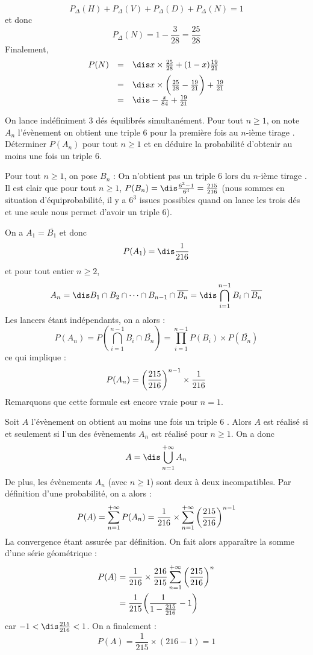 \documentclass[a4paper,10pt]{report}
\begin{document}
\begin{enumerate}
\begin{enumerate}
\[ P_{\Delta}(H) + P_{\Delta}(V) + P_{\Delta}(D) + P_{\Delta}(N) = 1 \]
et donc 
\[ P_{\Delta}(N) = 1 - \frac{3}{28} = \frac{25}{28} \]
Finalement,
\[ \begin{array}{ccl}
P(N) & = & \dis x \times \frac{25}{28}+ (1-x) \frac{19}{21} \\[0.2cm]
& = & \dis x \times \bigg{(} \frac{25}{28} - \frac{19}{21} \bigg{)} + \frac{19}{21} \\[0.2cm]
& = & \dis - \frac{x}{84} + \frac{19}{21} \\
\end{array}\]
\end{enumerate}
\end{enumerate}


\begin{Exercice}{} On lance indéfiniment 3 dés équilibrés simultanément. Pour tout $n \geq 1$, on note $A_n$ l'évènement \og on obtient une triple 6 pour la première fois au $n$-ième tirage \fg . Déterminer $P(A_n)$ pour tout $n \geq 1$ et en déduire la probabilité d'obtenir au moins une fois un triple $6$.
\end{Exercice}

\corr Pour tout $n \geq 1$, on pose $B_n$ : \og On n'obtient pas un triple 6 lors du $n$-ième tirage \fg . Il est clair que pour tout $n \geq 1$, $P(B_n) = \dis \frac{6^3-1}{6^3} = \frac{215}{216}$ (nous sommes en situation d'équiprobabilité, il y a $6^3$ issues possibles quand on lance les trois dés et une seule nous permet d'avoir un triple $6$).

\medskip

\noindent On a $A_1=\overline{B_1}$ et donc 
$$P(A_1) = \dis \frac{1}{216}$$
et pour tout entier $n \geq 2$, 
$$A_n = \dis B_1 \cap B_2 \cap \cdots \cap B_{n-1} \cap \overline{B_n} = \dis \bigcap_{i=1}^{n-1} B_i \cap \overline{B_n}$$
Les lancers étant indépendants, on a alors :
\[ P(A_n) = P(\bigcap_{i=1}^{n-1} B_i \cap \overline{B_n}) = \prod_{i=1}^{n-1} P(B_i) \times P( \overline{B_n})\]
ce qui implique :
\[ P(A_n) = \bigg{(} \frac{215}{216} \bigg{)}^{n-1} \times \frac{1}{216} \]
Remarquons que cette formule est encore vraie pour $n=1$.

\medskip
\noindent Soit $A$ l'évènement \og on obtient au moins une fois un triple $6$ \fg . Alors $A$ est réalisé si et seulement si l'un des évènements $A_n$ est réalisé pour $n \geq 1$. On a donc 
$$A= \dis \bigcup_{n=1}^{+ \infty} A_n$$
De plus, les évènements $A_n$ (avec $n \geq 1$) sont deux à deux incompatibles. Par définition d'une probabilité, on a alors :
\[ P(A) = \sum_{n=1}^{+ \infty} P(A_n) = \frac{1}{216} \times \sum_{n=1}^{+ \infty} \bigg{(} \frac{215}{216} \bigg{)}^{n-1} \]
La convergence étant assurée par définition. On fait alors apparaître la somme d'une série géométrique :
\begin{align*}
P(A) & = \frac{1}{216} \times \frac{216}{215} \sum_{n=1}^{+ \infty} \bigg{(} \frac{215}{216} \bigg{)}^{n} \\
& = \frac{1}{215} \bigg{(} \frac{1}{1-\frac{215}{216}} - 1 \bigg{)} 
\end{align*}
car $-1 < \dis \frac{215}{216} < 1$. On a finalement :
\[ P(A) = \frac{1}{215} \times (216-1) = 1 \]
\end{document}
